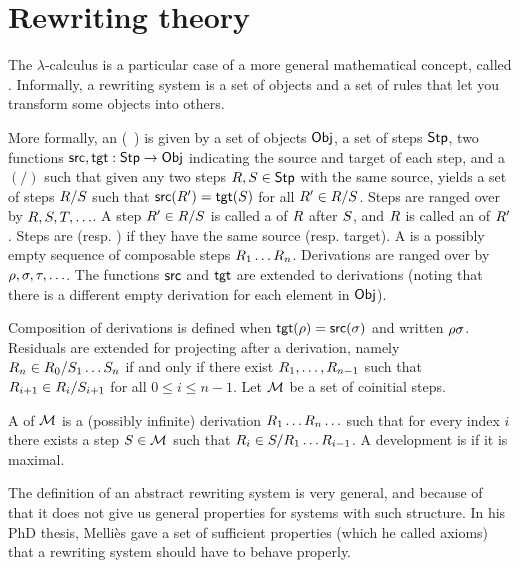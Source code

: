 \section{Rewriting theory}
The $\lambda$-calculus is a particular case of a more general mathematical concept, called .
Informally, a rewriting system is a set of objects and a set of rules that let you transform some objects into others.

More formally, an  (\cf~\cite[Def.~2.1]{thesismellies})
is given by a set of objects $\mathsf{Obj}$, a set of steps $\mathsf{Stp}$,
two functions $\mathsf{src},\mathsf{tgt} : \mathsf{Stp} \to \mathsf{Obj}$ indicating the source and target of each step,
and a  $(/)$ such that given any two steps $R,S \in \mathsf{Stp}$
with the same source, yields a set of steps $R/S$ such that $\mathsf{src}(R') = \mathsf{tgt}(S)$
for all $R' \in R/S$.
Steps are ranged over by $R,S,T,\hdots$.
A step $R' \in R/S$ is called a  of $R$ after $S$,
and $R$ is called an  of $R'$.
Steps are  (resp. ) if they have the same source (resp. target).
A  is a possibly empty sequence of composable steps $R_1\hdots R_n$.
Derivations are ranged over by $\rho,\sigma,\tau,\hdots$.
The functions $\mathsf{src}$ and $\mathsf{tgt}$ are extended to derivations (noting that there is a different empty derivation for each element in $\mathsf{Obj}$).

Composition of derivations is defined when $\mathsf{tgt}(\rho) = \mathsf{src}(\sigma)$ and written $\rho\sigma$.
Residuals are extended for projecting after a derivation,
namely $R_n \in R_0/S_1\hdots S_n$
if and only if there exist $R_1,\hdots,R_{n-1}$
such that $R_{i+1} \in R_i/S_{i+1}$ for all $0 \leq i \leq n - 1$.
Let $\mathcal{M}$ be a set of coinitial steps.

A  of $\mathcal{M}$ is a (possibly infinite) derivation $R_1\hdots R_n\hdots$
such that for every index $i$ there exists a step $S \in \mathcal{M}$
such that $R_i \in S/R_1\hdots R_{i-1}$.
A development is  if it is maximal.

The definition of an abstract rewriting system is very general, and because of that it does not give us
general properties for systems with such structure.
In his PhD thesis, Melliès gave a set of sufficient properties (which he called axioms)
that a rewriting system should have to behave properly.

